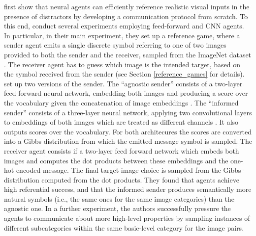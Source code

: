\cite{lazaridou2016multi} first show that neural agents can efficiently reference realistic visual inputs in the presence of distractors by developing a communication protocol from scratch. To this end, \textcite{lazaridou2016multi} conduct several experiments employing feed-forward and CNN agents. In particular, in their main experiment, they set up a reference game, where a sender agent emits a single discrete symbol referring to one of two images provided to both the sender and the receiver, sampled from the ImageNet dataset \parencite{deng2009imagenet}. The receiver agent has to guess  which image is the intended target, based on the symbol received from the sender (see Section \ref{reference_games} for details). %
\cite{lazaridou2016multi} set up two versions of the sender. The ``agnostic sender'' consists of a two-layer feed forward neural network, embedding both images and producing a score over the vocabulary given the concatenation of image embeddings \parencite[][p. 3]{lazaridou2016multi}. The ``informed sender'' consists of a three-layer neural network, applying two convolutional layers to embeddings of both images which are treated as different channels \parencite[][p. 3]{lazaridou2016multi}. It also outputs scores over the vocabulary. For both architecures the scores are converted into a Gibbs distribution from which the emitted message symbol is sampled. The receiver agent consists if a two-layer feed forward network which embeds both images and computes the dot products between these embeddings and the one-hot encoded message. The final target image choice is sampled from the Gibbs distribution computed from the dot products. %
They found that agents achieve high referential success, and that the informed sender produces semantically more natural symbols (i.e., the same ones for the same image categories) than the agnostic one. In a further experiment, the authors successfully pressure the agents to communicate about more high-level properties by sampling instances of different subcategories within the same basic-level category for the image pairs.%
